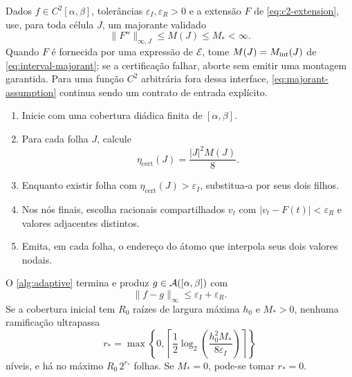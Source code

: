 \begin{algorithm}\label{alg:adaptive}
Dados $f\in C^2[\alpha,\beta]$, tolerâncias $\varepsilon_I,\varepsilon_R>0$ e a extensão $F$ de \eqref{eq:c2-extension}, use, para toda célula $J$, um majorante validado
\begin{equation}
 \|F''\|_{\infty,J}\le M(J)\le M_*<\infty.
 \label{eq:majorant-assumption}
\end{equation}
Quando $F$ é fornecida por uma expressão de $\mathcal E$, tome
$M(J)=M_{\rm int}(J)$ de \eqref{eq:interval-majorant}; se a certificação
falhar, aborte sem emitir uma montagem garantida. Para uma função $C^2$
arbitrária fora dessa interface, \eqref{eq:majorant-assumption} continua sendo
um contrato de entrada explícito.
\begin{enumerate}[label=(\roman*),leftmargin=2.1em]
 \item Inicie com uma cobertura diádica finita de $[\alpha,\beta]$.
 \item Para cada folha $J$, calcule
 \begin{equation}
  \eta_{\mathrm{cert}}(J)=\frac{|J|^2M(J)}8.
  \label{eq:certificate}
 \end{equation}
 \item Enquanto existir folha com $\eta_{\mathrm{cert}}(J)>\varepsilon_I$, substitua-a por seus dois filhos.
 \item Nos nós finais, escolha racionais compartilhados $v_t$ com $|v_t-F(t)|<\varepsilon_R$ e valores adjacentes distintos.
 \item Emita, em cada folha, o endereço do átomo que interpola seus dois valores nodais.
\end{enumerate}
\end{algorithm}

\begin{theorem}\label{thm:adaptive}
O \cref{alg:adaptive} termina e produz $g\in\mathcal{A}([\alpha,\beta])$ com
\begin{equation}
 \|f-g\|_\infty\le\varepsilon_I+\varepsilon_R.
 \label{eq:adaptive-error}
\end{equation}
Se a cobertura inicial tem $R_0$ raízes de largura máxima $h_0$ e $M_*>0$, nenhuma ramificação ultrapassa
\begin{equation}
 r_*=\max\left\{0,
 \left\lceil\frac12\log_2\!\left(\frac{h_0^2M_*}{8\varepsilon_I}\right)\right\rceil
 \right\}
 \label{eq:depth}
\end{equation}
níveis, e há no máximo $R_0\,2^{r_*}$ folhas. Se $M_*=0$, pode-se tomar $r_*=0$.
\end{theorem}

